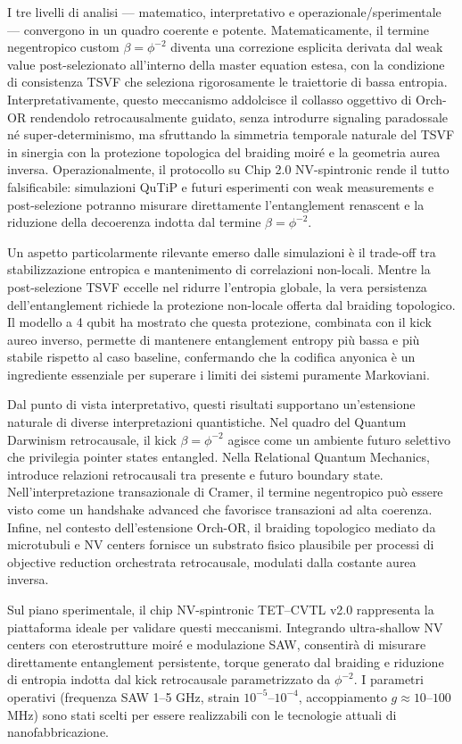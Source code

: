 \documentclass[11pt,a4paper]{article}
\theoremstyle{plain}
\theoremstyle{definition}
\begin{document}
I tre livelli di analisi — matematico, interpretativo e operazionale/sperimentale — convergono in un quadro coerente e potente. Matematicamente, il termine negentropico custom \(\beta = \phi^{-2}\) diventa una correzione esplicita derivata dal weak value post-selezionato all'interno della master equation estesa, con la condizione di consistenza TSVF che seleziona rigorosamente le traiettorie di bassa entropia. Interpretativamente, questo meccanismo addolcisce il collasso oggettivo di Orch-OR rendendolo retrocausalmente guidato, senza introdurre signaling paradossale né super-determinismo, ma sfruttando la simmetria temporale naturale del TSVF in sinergia con la protezione topologica del braiding moiré e la geometria aurea inversa. Operazionalmente, il protocollo su Chip 2.0 NV-spintronic rende il tutto falsificabile: simulazioni QuTiP e futuri esperimenti con weak measurements e post-selezione potranno misurare direttamente l'entanglement renascent e la riduzione della decoerenza indotta dal termine \(\beta = \phi^{-2}\).

Un aspetto particolarmente rilevante emerso dalle simulazioni è il trade-off tra stabilizzazione entropica e mantenimento di correlazioni non-locali. Mentre la post-selezione TSVF eccelle nel ridurre l'entropia globale, la vera persistenza dell'entanglement richiede la protezione non-locale offerta dal braiding topologico. Il modello a 4 qubit ha mostrato che questa protezione, combinata con il kick aureo inverso, permette di mantenere entanglement entropy più bassa e più stabile rispetto al caso baseline, confermando che la codifica anyonica è un ingrediente essenziale per superare i limiti dei sistemi puramente Markoviani.

Dal punto di vista interpretativo, questi risultati supportano un'estensione naturale di diverse interpretazioni quantistiche. Nel quadro del Quantum Darwinism retrocausale, il kick \(\beta = \phi^{-2}\) agisce come un ambiente futuro selettivo che privilegia pointer states entangled. Nella Relational Quantum Mechanics, introduce relazioni retrocausali tra presente e futuro boundary state. Nell'interpretazione transazionale di Cramer, il termine negentropico può essere visto come un handshake advanced che favorisce transazioni ad alta coerenza. Infine, nel contesto dell'estensione Orch-OR, il braiding topologico mediato da microtubuli e NV centers fornisce un substrato fisico plausibile per processi di objective reduction orchestrata retrocausale, modulati dalla costante aurea inversa.

Sul piano sperimentale, il chip NV-spintronic TET–CVTL v2.0 rappresenta la piattaforma ideale per validare questi meccanismi. Integrando ultra-shallow NV centers con eterostrutture moiré e modulazione SAW, consentirà di misurare direttamente entanglement persistente, torque generato dal braiding e riduzione di entropia indotta dal kick retrocausale parametrizzato da \(\phi^{-2}\). I parametri operativi (frequenza SAW 1–5 GHz, strain \(10^{-5}\)–\(10^{-4}\), accoppiamento \(g \approx 10\)–\(100\) MHz) sono stati scelti per essere realizzabili con le tecnologie attuali di nanofabbricazione.
\end{document}
